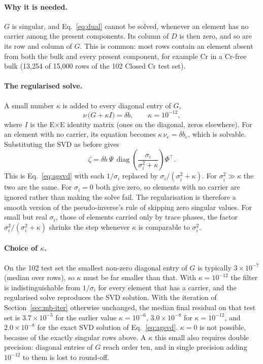 \documentclass[11pt]{article}
\begin{document}
\paragraph{Why it is needed.} $G$ is singular, and Eq.~\eqref{eq:dual} cannot be solved,
whenever an element has no carrier among the present components. Its column of $D$ is then
zero, and so are its row and column of $G$. This is common: most rows contain an element
absent from both the bulk and every present component, for example Cr in a Cr-free bulk
(13{,}254 of 15{,}000 rows of the 102 Closed Cr test set).

\paragraph{The regularised solve.} A small number $\kappa$ is added to every diagonal entry
of $G$,
\begin{equation}
  \nu\,\big(G + \kappa I\big) = \delta b,
  \qquad \kappa = 10^{-12},
  \label{eq:regsolve}
\end{equation}
where $I$ is the E$\times$E identity matrix (ones on the diagonal, zeros elsewhere). For an
element with no carrier, its equation becomes $\kappa\,\nu_e = \delta b_e$, which is
solvable. Substituting the SVD as before gives
\begin{equation}
  \zeta = \delta b\; \Psi\, \operatorname{diag}\!\left(\frac{\sigma_i}{\sigma_i^2 + \kappa}\right) \Phi^{\!\top}.
  \label{eq:filter}
\end{equation}
This is Eq.~\eqref{eq:agsvd} with each $1/\sigma_i$ replaced by $\sigma_i/(\sigma_i^2 + \kappa)$.
For $\sigma_i^2 \gg \kappa$ the two are the same. For $\sigma_i = 0$ both give zero, so
elements with no carrier are ignored rather than making the solve fail. The regularisation
is therefore a smooth version of the pseudo-inverse's rule of skipping zero singular values.
For small but real $\sigma_i$, those of elements carried only by trace phases, the factor
$\sigma_i^2/(\sigma_i^2 + \kappa)$ shrinks the step whenever $\kappa$ is comparable to
$\sigma_i^2$.

\paragraph{Choice of $\kappa$.} On the 102 test set the smallest non-zero diagonal entry of
$G$ is typically $3\times10^{-7}$ (median over rows), so $\kappa$ must be far smaller than
that. With $\kappa = 10^{-12}$ the filter is indistinguishable from $1/\sigma_i$ for every
element that has a carrier, and the regularised solve reproduces the SVD solution. With the
iteration of Section~\ref{sec:mb-iter} otherwise unchanged, the median final residual on
that test set is $3.7\times10^{-5}$ for the earlier value $\kappa = 10^{-6}$,
$3.0\times10^{-8}$ for $\kappa = 10^{-12}$, and $2.0\times10^{-8}$ for the exact SVD
solution of Eq.~\eqref{eq:agsvd}. $\kappa = 0$ is not possible, because of the exactly
singular rows above. A $\kappa$ this small also requires double precision: diagonal entries
of $G$ reach order ten, and in single precision adding $10^{-12}$ to them is lost to
round-off.
\end{document}
